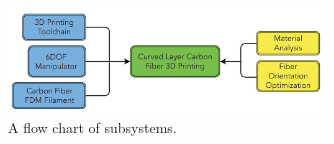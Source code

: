 \begin{figure}[htp]
\centering
\includegraphics[width=0.75\textwidth]{./figures/flowchart}
\caption{A flow chart of subsystems.}
\label{fig:flowchart}
\end{figure}

